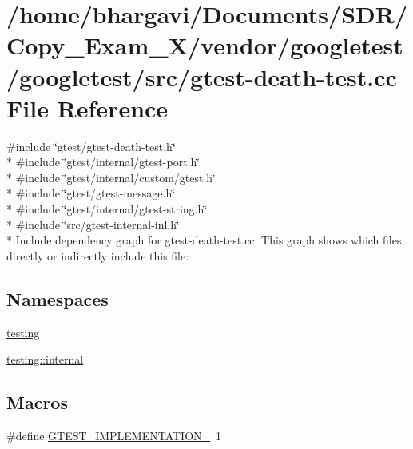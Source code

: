 \hypertarget{gtest-death-test_8cc}{}\section{/home/bhargavi/\+Documents/\+S\+D\+R/\+Copy\+\_\+\+Exam\+\_\+X/vendor/googletest/googletest/src/gtest-\/death-\/test.cc File Reference}
\label{gtest-death-test_8cc}
{\ttfamily \#include \char`\"{}gtest/gtest-\/death-\/test.\+h\char`\"{}}\\*
{\ttfamily \#include \char`\"{}gtest/internal/gtest-\/port.\+h\char`\"{}}\\*
{\ttfamily \#include \char`\"{}gtest/internal/custom/gtest.\+h\char`\"{}}\\*
{\ttfamily \#include \char`\"{}gtest/gtest-\/message.\+h\char`\"{}}\\*
{\ttfamily \#include \char`\"{}gtest/internal/gtest-\/string.\+h\char`\"{}}\\*
{\ttfamily \#include \char`\"{}src/gtest-\/internal-\/inl.\+h\char`\"{}}\\*
Include dependency graph for gtest-\/death-\/test.cc\+:
This graph shows which files directly or indirectly include this file\+:
\subsection*{Namespaces}
\begin{DoxyCompactItemize}
\item 
 \hyperlink{namespacetesting}{testing}
\item 
 \hyperlink{namespacetesting_1_1internal}{testing\+::internal}
\end{DoxyCompactItemize}
\subsection*{Macros}
\begin{DoxyCompactItemize}
\item 
\#define \hyperlink{gtest-death-test_8cc_a83bd232fd1077579fada92c31bb7469f}{G\+T\+E\+S\+T\+\_\+\+I\+M\+P\+L\+E\+M\+E\+N\+T\+A\+T\+I\+O\+N\+\_\+}~1
\end{DoxyCompactItemize}
